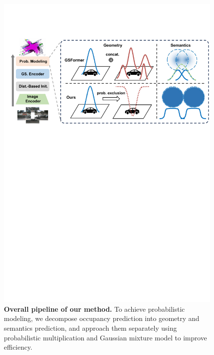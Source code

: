 \begin{figure}[t]
\centering
\includegraphics[width=0.95\linewidth]{figures/pipeline_1.pdf}
\vspace{-2mm}
\caption{\textbf{Overall pipeline of our method.}
To achieve probabilistic modeling, we decompose occupancy prediction into geometry and semantics prediction, and approach them separately using probabilistic multiplication and Gaussian mixture model to improve efficiency.
}
\label{fig:pipeline}
\vspace{-6mm}
\end{figure}



